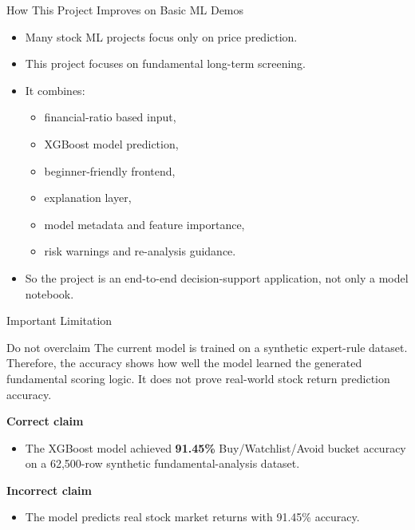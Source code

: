 \documentclass[aspectratio=169]{beamer}
\begin{document}
\begin{frame}{How This Project Improves on Basic ML Demos}
\small
\begin{itemize}
  \item Many stock ML projects focus only on price prediction.
  \item This project focuses on fundamental long-term screening.
  \item It combines:
  \begin{itemize}
    \item financial-ratio based input,
    \item XGBoost model prediction,
    \item beginner-friendly frontend,
    \item explanation layer,
    \item model metadata and feature importance,
    \item risk warnings and re-analysis guidance.
  \end{itemize}
  \item So the project is an end-to-end decision-support application, not only a model notebook.
\end{itemize}
\end{frame}

\begin{frame}{Important Limitation}
\small
\begin{alertblock}{Do not overclaim}
The current model is trained on a synthetic expert-rule dataset. Therefore, the accuracy shows how well the model learned the generated fundamental scoring logic. It does not prove real-world stock return prediction accuracy.
\end{alertblock}

\vspace{0.2cm}
\textbf{Correct claim}
\begin{itemize}
  \item The XGBoost model achieved \textbf{91.45\%} Buy/Watchlist/Avoid bucket accuracy on a 62,500-row synthetic fundamental-analysis dataset.
\end{itemize}

\textbf{Incorrect claim}
\begin{itemize}
  \item The model predicts real stock market returns with 91.45\% accuracy.
\end{itemize}
\end{frame}
\end{document}
